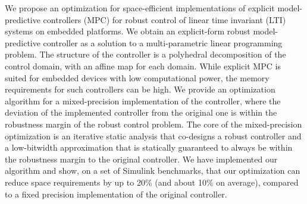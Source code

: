 We propose an optimization for space-efficient implementations of explicit model-predictive controllers (MPC)
for robust control of linear time invariant (LTI) systems on embedded platforms. 
We obtain an explicit-form robust model-predictive controller as a solution to a multi-parametric 
linear programming problem.
The structure of the controller is a polyhedral decomposition of the control domain,
with an affine map for each domain.
While explicit MPC is suited for embedded devices with low computational power, the memory requirements
for such controllers can be high.
We provide an optimization algorithm for a mixed-precision implementation of the controller,
where the deviation of the implemented controller from the original one is within the robustness
margin of the robust control problem.
The core of the mixed-precision optimization is an iterative static analysis that co-designs
a robust controller and a low-bitwidth approximation 
that is statically guaranteed to always be within the robustness margin to the original controller.
We have implemented our algorithm and show, on a set of Simulink benchmarks, that our optimization
can reduce space requirements by up to 20\% (and about 10\% on average), compared to a fixed precision
implementation of the original controller.

